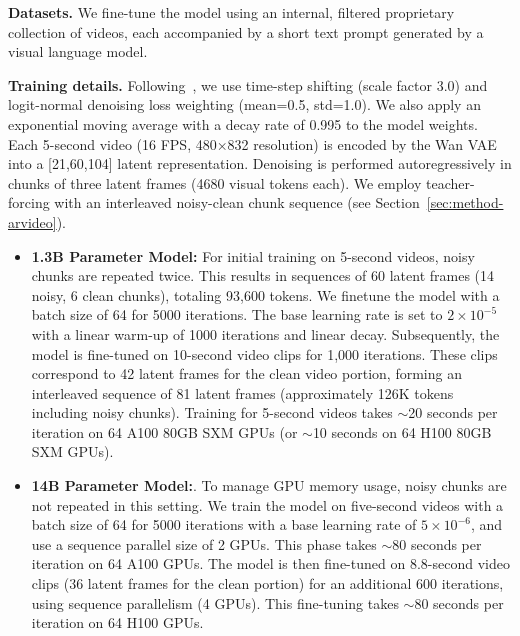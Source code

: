 
\noindent\textbf{Datasets.} We fine-tune the model using an internal, filtered proprietary collection of videos, each accompanied by a short text prompt generated by a visual language model\cite{chen2024internvl}.

\noindent\textbf{Training details.}
Following~\cite{esser2403scaling, wang2025wan}, we use time-step shifting (scale factor 3.0) and logit-normal denoising loss weighting (mean=0.5, std=1.0). We also apply an exponential moving average with a decay rate of 0.995 to the model weights.  Each 5-second video (16 FPS, 480×832 resolution) is encoded by the Wan VAE into a [21,60,104] latent representation. Denoising is performed autoregressively in chunks of three latent frames (4680 visual tokens each). We employ teacher-forcing with an interleaved noisy-clean chunk sequence (see Section~\ref{sec:method-arvideo}). 

\begin{itemize}
    \item \textbf{1.3B Parameter Model:} For initial training on 5-second videos, noisy chunks are repeated twice. This results in sequences of 60 latent frames (14 noisy, 6 clean chunks), totaling 93,600 tokens. We finetune the model with a batch size of 64 for 5000 iterations. The base learning rate is set to $2\times10^{-5}$ with a linear warm-up of 1000 iterations and linear decay.  Subsequently, the model is fine-tuned on 10-second video clips for 1,000 iterations. These clips correspond to 42 latent frames for the clean video portion, forming an interleaved sequence of 81 latent frames (approximately 126K tokens including noisy chunks).   Training for 5-second videos takes $\sim$20 seconds per iteration on 64 A100 80GB SXM GPUs (or $\sim$10 seconds on 64 H100 80GB SXM GPUs).
    \item  \textbf{14B Parameter Model:}. To manage GPU memory usage, noisy chunks are not repeated in this setting. We train the model on five-second videos with a batch size of 64 for 5000 iterations with a base learning rate of $5\times10^{-6}$, and use a sequence parallel size of 2 GPUs. This phase takes $\sim$80 seconds per iteration on 64 A100 GPUs. The model is then fine-tuned on 8.8-second video clips (36 latent frames for the clean portion) for an additional 600 iterations, using sequence parallelism (4 GPUs). This fine-tuning takes $\sim$80 seconds per iteration on 64 H100 GPUs.
\end{itemize}


